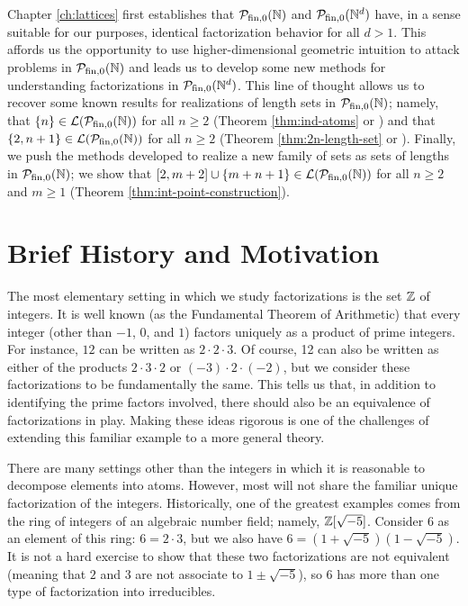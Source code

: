 Chapter \ref{ch:lattices} first establishes that ${\mathcal{P}_{\textrm{fin},0}(\mathbb{N})}$ and $\mathcal{P}_{\textrm{fin}, 0}(\mathbb{N}^d)$ have, in a sense suitable for our purposes, identical factorization behavior for all $d>1$.
This affords us the opportunity to use higher-dimensional geometric intuition to attack problems in ${\mathcal{P}_{\textrm{fin},0}(\mathbb{N})}$ and leads us to develop some new methods for understanding factorizations in $\mathcal{P}_{\textrm{fin}, 0}(\mathbb{N}^d)$.
This line of thought allows us to recover some known results for realizations of length sets in ${\mathcal{P}_{\textrm{fin},0}(\mathbb{N})}$; namely, that $\{n\} \in\mathcal{L}({\mathcal{P}_{\textrm{fin},0}(\mathbb{N})})$ for all $n\ge 2$ (Theorem \ref{thm:ind-atoms} or  \cite[Proposition 4.9]{fan-tringali18}) and that $\{2,n+1\}\in \mathcal{L}({\mathcal{P}_{\textrm{fin},0}(\mathbb{N})})$ for all $n\ge 2$ (Theorem \ref{thm:2n-length-set} or \cite[Proposition 4.10]{fan-tringali18}).
Finally, we push the methods developed to realize a new family of sets as sets of lengths in ${\mathcal{P}_{\textrm{fin},0}(\mathbb{N})}$; we show that $[2,m+2]\cup\{m+n+1\}\in \mathcal{L}({\mathcal{P}_{\textrm{fin},0}(\mathbb{N})})$ for all $n\ge 2$ and $m\ge 1$ (Theorem \ref{thm:int-point-construction}).

\section{Brief History and Motivation}

The most elementary setting in which we study factorizations is the set $\mathbb{Z}$ of integers.
It is well known (as the Fundamental Theorem of Arithmetic) that every integer (other than $-1$, $0$, and $1$) factors uniquely as a product of prime integers.
For instance, $12$ can be written as $2\cdot 2\cdot 3$.
Of course, 12 can also be written as either of the products $2\cdot 3\cdot 2$ or $(-3)\cdot 2\cdot (-2)$, but we consider these factorizations to be fundamentally the same.  
This tells us that, in addition to identifying the prime factors involved, there should also be an equivalence of factorizations in play.
Making these ideas rigorous is one of the challenges of extending this familiar example to a more general theory.


There are many settings other than the integers in which it is reasonable to decompose elements into atoms. 
However, most will not share the familiar unique factorization of the integers.  
Historically, one of the greatest examples comes from the ring of integers of an algebraic number field; namely, $\mathbb{Z}[\sqrt{-5}]$.
Consider $6$ as an element of this ring: $6=2\cdot3$, but we also have $6 = (1+\sqrt{-5})(1-\sqrt{-5})$.
It is not a hard exercise to show that these two factorizations are not equivalent (meaning that $2$ and $3$ are not associate to $1\pm\sqrt{-5}$), so $6$ has more than one type of factorization into irreducibles.

